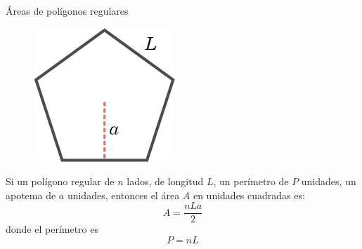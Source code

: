 \begin{infocard}{Áreas de polígonos regulares}
    \begin{figure}
        \centering
        \includegraphics[width=\linewidth]{../images/apotema.png}
    \end{figure}
    Si un polígono regular de $n$ lados, de longitud $L$, un perímetro de $P$ unidades, un apotema de $a$ unidades, entonces el área $A$ en unidades cuadradas es:
        \[A=\dfrac{nLa}{2}\]
        donde el perímetro es 
        \[P=nL\]
\end{infocard}
